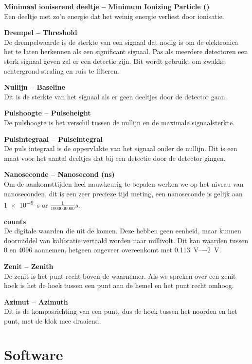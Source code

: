 \textbf{Minimaal ioniserend deeltje -- Minimum Ionizing Particle (\mip)} \\
Een deeltje met zo'n energie dat het weinig energie verliest door
ionisatie.

\textbf{Drempel -- Threshold} \\
De drempelwaarde is de sterkte van een signaal dat nodig is om de
\hisparc elektronica het te laten herkennen als een significant signaal. Pas als
meerdere detectoren een sterk signaal geven zal er een detectie zijn.
Dit wordt gebruikt om zwakke achtergrond straling en ruis te filteren.

\textbf{Nullijn -- Baseline} \\
Dit is de sterkte van het signaal als er geen
deeltjes door de detector gaan.

\textbf{Pulshoogte -- Pulseheight} \\
De pulshoogte is het verschil tussen de nullijn en de maximale signaalsterkte.

\textbf{Pulsintegraal -- Pulseintegral} \\
De puls integraal is de oppervlakte van het signaal onder de nullijn.
Dit is een maat voor het aantal deeltjes dat bij een detectie door de
detector gingen.

\textbf{Nanoseconde -- Nanosecond (ns)} \\
Om de aankomsttijden heel nauwkeurig te bepalen werken we op het niveau
van nanoseconden, dit is een zeer precieze tijd meting, een nanoseconde
is gelijk aan \SI{1e-9}{\second} or $\frac{1}{1000000000} s$.

\textbf{\adc counts} \\
De digitale waarden die uit de \adc komen. Deze hebben geen eenheid,
maar kunnen doormiddel van kalibratie vertaald worden naar millivolt.
Dit kan waarden tussen 0 en 4096 aannemen, hetgeen ongeveer overeenkomt met
\SIrange{+0.113}{-2}{\volt}.

\textbf{Zenit -- Zenith} \\
De zenit is het punt recht boven de waarnemer. Als we spreken over een
zenit hoek is het de hoek tussen een punt aan de hemel en het punt recht
omhoog.

\textbf{Azimut -- Azimuth} \\
Dit is de kompasrichting van een punt, dus de hoek tussen het noorden en
het punt, met de klok mee draaiend.


\section{Software}

